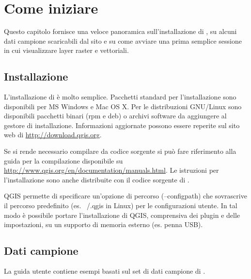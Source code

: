 
\chapter{Come iniziare}\label{label_getstarted}


Questo capitolo fornisce una veloce panoramica sull'installazione
di \qg, su alcuni dati campione scaricabili dal sito \qg e su come avviare
una prima semplice sessione in cui visualizzare layer raster
e vettoriali.

\section{Installazione}\label{label_installation}

L'installazione di \qg è molto semplice. Pacchetti standard per l'installazione
sono disponibili per MS Windows e Mac OS X. Per le distribuzioni GNU/Linux
sono disponibili pacchetti binari (rpm e deb) o archivi software
da aggiungere al gestore di installazione. Informazioni aggiornate
possono essere reperite sul sito web di \qg \url{http://download.qgis.org}.


Se si rende necessario compilare \qg da codice sorgente si può fare riferimento alla guida 
per la compilazione disponibile su \url{http://www.qgis.org/en/documentation/manuals.html}.
Le istruzioni per l'installazione sono anche distribuite con il codice sorgente di \qg.


QGIS permette di specificare un'opzione di percorso (--configpath) che sovrascrive 
il percorso predefinito (es. ~/.qgis in Linux) per le configurazioni utente. 
In tal modo è possibile portare l'installazione di QGIS, comprensiva dei plugin 
e delle impostazioni, su un supporto di memoria esterno (es. penna USB). 

\section{Dati campione}\label{label_sampledata}

La guida utente contiene esempi basati sul set di dati campione di
\qg.

